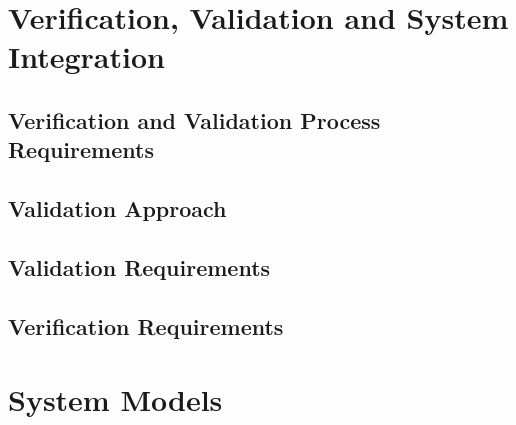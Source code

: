 \documentclass[12pt,a4paper]{article}
\begin{document}
\section{Verification, Validation and System Integration}
\subsection{Verification and Validation Process Requirements}
\subsection{Validation Approach}
\subsection{Validation Requirements}
\subsection{Verification Requirements}

\section{System Models}

\newpage
\printbibliography
\end{document}
